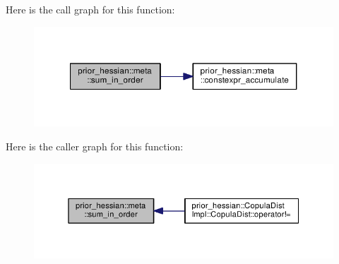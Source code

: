 Here is the call graph for this function\+:\nopagebreak
\begin{figure}[H]
\begin{center}
\leavevmode
\includegraphics[width=327pt]{namespaceprior__hessian_1_1meta_ab09470f06d05f5c58e249a03ef19242f_cgraph}
\end{center}
\end{figure}




Here is the caller graph for this function\+:\nopagebreak
\begin{figure}[H]
\begin{center}
\leavevmode
\includegraphics[width=345pt]{namespaceprior__hessian_1_1meta_ab09470f06d05f5c58e249a03ef19242f_icgraph}
\end{center}
\end{figure}


